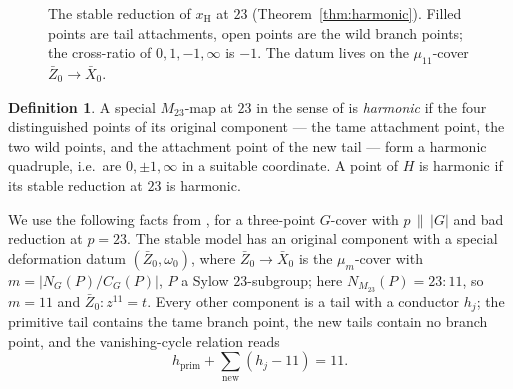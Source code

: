 \documentclass[11pt]{amsart}
\newcommand{\PP}{\mathbb{P}}
\newcommand{\Mtw}{M_{23}}
\newcommand{\xH}{x_{\mathrm H}}
\theoremstyle{plain}
\theoremstyle{definition}
\newtheorem{definition}[theorem]{Definition}
\begin{document}
\begin{figure}[t]
\centering
{}
\caption{The stable reduction of $\xH$ at $23$ (Theorem~\ref{thm:harmonic}).
Filled points are tail attachments, open points are the wild branch
points; the cross-ratio of $0,1,-1,\infty$ is $-1$. The datum lives
on the $\mu_{11}$-cover $\bar Z_0\to\bar X_0$.}
\label{fig:stable}
\end{figure}

\begin{definition}\label{def:harmonic}
A special $\Mtw$-map at $23$ in the sense of \cite{Wewers} is
\emph{harmonic} if the four distinguished points of its original
component --- the tame attachment point, the two wild points, and the
attachment point of the new tail --- form a harmonic quadruple, i.e.\
are $0,\pm1,\infty$ in a suitable coordinate. A point of $H$ is
harmonic if its stable reduction at $23$ is harmonic.
\end{definition}

We use the following facts from \cite{Wewers}, for a three-point
$G$-cover with $p\,\|\,|G|$ and bad reduction at $p=23$. The stable
model has an original component with a special deformation datum
$(\bar Z_0,\omega_0)$, where $\bar Z_0\to\bar X_0$ is the
$\mu_m$-cover with $m=|N_G(P)/C_G(P)|$, $P$ a Sylow $23$-subgroup;
here $N_{\Mtw}(P)=23{:}11$, so $m=11$ and $\bar Z_0\colon z^{11}=t$.
Every other component is a tail with a conductor $h_j$; the primitive
tail contains the tame branch point, the new tails contain no branch
point, and the vanishing-cycle relation reads
\[
  h_{\mathrm{prim}}+\sum_{\text{new}}(h_j-11)=11 .
\]
\end{document}

